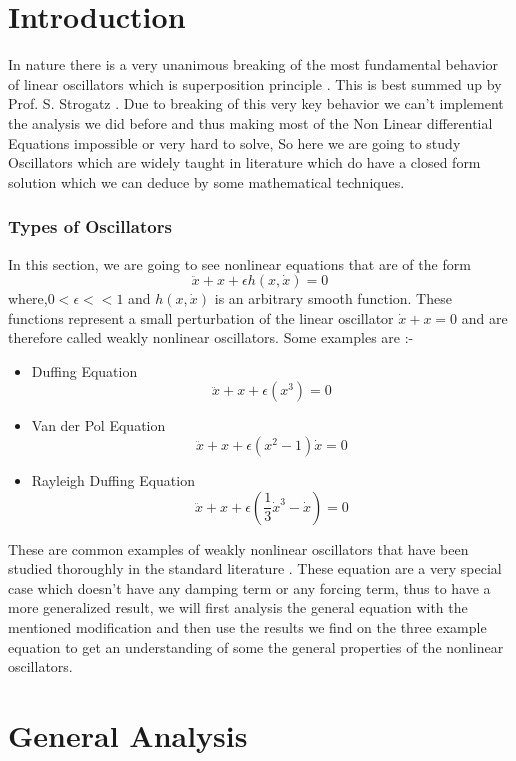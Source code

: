 \documentclass[10pt,twoside]{report}
\begin{document}
\section{Introduction}
In nature there is a very unanimous breaking of the most fundamental behavior of linear oscillators which is superposition principle . This is best summed up by Prof. S. Strogatz  . Due to breaking of this very key behavior we can't implement the analysis we did before and thus making most of the Non Linear differential Equations impossible or very hard to solve, So here we are going to study  Oscillators which are widely taught in literature which do have a closed form solution which we can deduce by some mathematical techniques. 

\subsubsection{Types of Oscillators}
In this section, we are going to see nonlinear equations that are of the form  $$\ddot{x} +x+\epsilon h(x,\dot{x}) = 0$$ 
where,\qquad $0<\epsilon<<1$ and $h(x,\dot{x})$ is an arbitrary smooth function. These functions represent a small perturbation of the linear oscillator $\dot{x}+x=0$ and are therefore called weakly nonlinear oscillators. Some examples are :-
\begin{itemize}
    \item Duffing Equation $$\ddot{x}+x+\epsilon(x^3) = 0$$
    \item Van der Pol Equation $$\ddot{x}+x+\epsilon(x^2-1)\dot{x} = 0$$
    \item Rayleigh Duffing Equation $$\ddot{x}+x+\epsilon(\frac{1}{3}\dot{x}^3-\dot{x}) = 0$$
\end{itemize}

These are common examples of weakly nonlinear oscillators that have been studied thoroughly in the standard literature . These equation are a very special case which doesn't have any damping term or any forcing term, thus to have a more generalized result, we will first analysis the general equation with the mentioned modification and then use the results we find on the three example equation to get an understanding of some the general properties of the nonlinear oscillators.  

\section{General Analysis}
\end{document}
